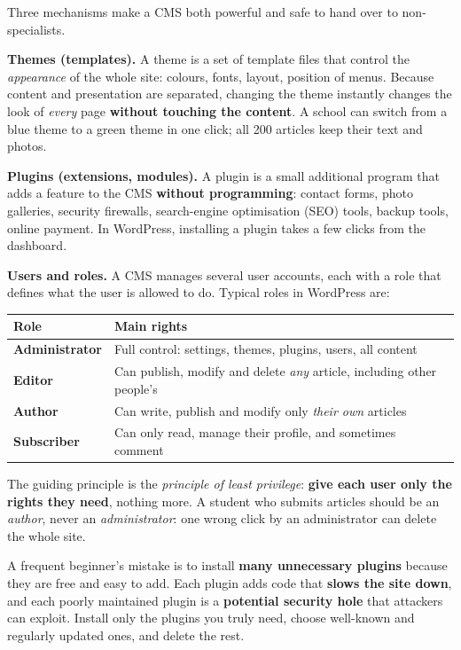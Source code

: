 \documentclass[11pt]{article}
\newcommand{\cle}[1]{{\popxbold\color{popdark}#1}}
\newcounter{popsec}
\newcounter{popsub}
\newcommand{\courssub}[1]{%
  \stepcounter{popsub}%
  \par\vspace{9pt}\noindent{\popxbold\fontsize{11.5}{13}\selectfont\color{popink}{\color{poporange}\thepopsec.\thepopsub}\hspace{6pt}#1}\par\nopagebreak\vspace{4pt}
}
\begin{document}
\courssub{Themes, plugins, users and roles}

Three mechanisms make a CMS both powerful and safe to hand over to non-specialists.

\textbf{Themes (templates).} A \cle{theme} is a set of template files that control the \emph{appearance} of the whole site: colours, fonts, layout, position of menus. Because content and presentation are separated, changing the theme instantly changes the look of \emph{every} page \textbf{without touching the content}. A school can switch from a blue theme to a green theme in one click; all 200 articles keep their text and photos.

\textbf{Plugins (extensions, modules).} A \cle{plugin} is a small additional program that adds a feature to the CMS \textbf{without programming}: contact forms, photo galleries, security firewalls, search-engine optimisation (SEO) tools, backup tools, online payment. In WordPress, installing a plugin takes a few clicks from the dashboard.

\textbf{Users and roles.} A CMS manages several user accounts, each with a \cle{role} that defines what the user is allowed to do. Typical roles in WordPress are:

\begin{center}
\begin{tabularx}{\linewidth}{|l|X|}
\hline
\rowcolor{popblueL}\textbf{Role} & \textbf{Main rights} \\
\hline
\rowcolors{1}{popblueL}{white}
\textbf{Administrator} & Full control: settings, themes, plugins, users, all content \\
\hline
\textbf{Editor} & Can publish, modify and delete \emph{any} article, including other people's \\
\hline
\textbf{Author} & Can write, publish and modify only \emph{their own} articles \\
\hline
\textbf{Subscriber} & Can only read, manage their profile, and sometimes comment \\
\hline
\end{tabularx}
\end{center}

The guiding principle is the \emph{principle of least privilege}: \textbf{give each user only the rights they need}, nothing more. A student who submits articles should be an \emph{author}, never an \emph{administrator}: one wrong click by an administrator can delete the whole site.

\begin{attention}
A frequent beginner's mistake is to install \textbf{many unnecessary plugins} because they are free and easy to add. Each plugin adds code that \textbf{slows the site down}, and each poorly maintained plugin is a \textbf{potential security hole} that attackers can exploit. Install only the plugins you truly need, choose well-known and regularly updated ones, and delete the rest.
\end{attention}
\end{document}
